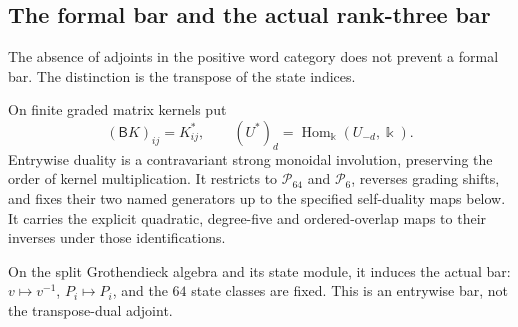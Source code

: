 \subsection{The formal bar and the actual rank-three bar}
The absence of adjoints in the positive word category does not
prevent a formal bar. The distinction is the transpose of the
state indices.

\begin{finding}
\label{f:formalkernelbar}
On finite graded matrix kernels put
\[
 (\mathsf B K)_{ij}=K_{ij}^*,\qquad
 (U^*)_d=\operatorname{Hom}_{\Bbbk}(U_{-d},\Bbbk).
\]
Entrywise duality is a contravariant strong monoidal involution,
preserving the order of kernel multiplication. It restricts to
$\mathcal P_{64}$ and $\mathcal P_6$, reverses grading shifts,
and fixes their two named generators up to the specified
self-duality maps below. It carries the explicit quadratic,
degree-five and ordered-overlap maps to their inverses under
those identifications.

On the split Grothendieck algebra and its state module, it
induces the actual  bar: $v\mapsto v^{-1}$,
$P_i\mapsto P_i$, and the $64$ state classes are fixed.
This is an entrywise bar, not the transpose-dual adjoint.
\end{finding}


